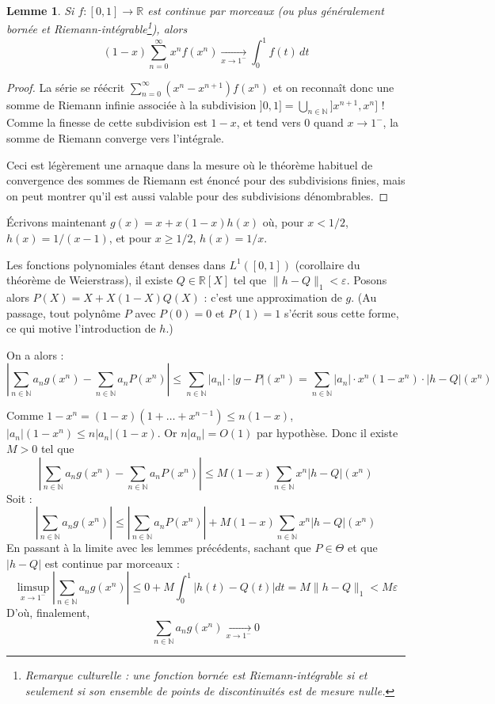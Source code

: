 \documentclass[a4paper, 11pt]{article}
\def\N{\mathbb{N}}
\def\R{\mathbb{R}}
\newtheorem*{lemma}{Lemme}
\begin{document}
\begin{lemma}
  Si $f : [0,1] \to \R$ est continue par morceaux (ou plus généralement bornée
  et Riemann-intégrable\footnote{Remarque culturelle : une fonction bornée est
    Riemann-intégrable si et seulement si son ensemble de points de
    discontinuités est de mesure nulle.}), alors
  \[ (1-x) \sum_{n=0}^\infty x^nf(x^n) \xrightarrow[x \to 1^{-}]{} \int_0^1
    f(t)\,dt\]
\end{lemma}
\begin{proof}
  La série se réécrit $\sum_{n=0}^\infty (x^n - x^{n+1})f(x^n)$ et on reconnaît
  donc une somme de Riemann infinie associée à la subdivision $]0,1] =
  \bigcup_{n \in \N} ]x^{n+1},x^n]$ ! Comme la finesse de cette subdivision est
  $1-x$, et tend vers $0$ quand $x \to 1^-$, la somme de Riemann converge vers
  l'intégrale.
  
  Ceci est légèrement une arnaque dans la mesure où le théorème habituel de
  convergence des sommes de Riemann est énoncé pour des subdivisions finies,
  mais on peut montrer qu'il est aussi valable pour des subdivisions
  dénombrables.
\end{proof}

Écrivons maintenant $g(x) = x + x(1-x)h(x)$ où, pour $x < 1/2$, $h(x) =
1/(x-1)$, et pour $x \geq 1/2$, $h(x) = 1/x$. 

Les fonctions polynomiales étant denses dans $L^1([0,1])$ (corollaire du
théorème de Weierstrass), il existe $Q \in \R[X]$ tel que $\|h-Q\|_1 <
\varepsilon$. Posons alors $P(X) = X + X(1-X)Q(X)$ : c'est une approximation de
$g$. (Au passage, tout polynôme $P$ avec $P(0) = 0$ et $P(1) = 1$ s'écrit sous
cette forme, ce qui motive l'introduction de $h$.)

On a alors :
\[ \left| \sum_{n \in \N} a_n g(x^n) - \sum_{n \in \N} a_n P(x^n) \right| \leq
  \sum_{n \in \N} |a_n| \cdot |g - P|(x^n) = \sum_{n \in \N} |a_n| \cdot
  x^n(1-x^n) \cdot |h - Q|(x^n) \]

Comme $1-x^n = (1-x)(1+ \ldots + x^{n-1}) \leq n(1-x)$, $|a_n|(1-x^n) \leq
n|a_n|(1-x)$. Or $n|a_n| = O(1)$ par hypothèse. Donc il existe $M > 0$ tel que
\[ \left| \sum_{n \in \N} a_n g(x^n) - \sum_{n \in \N} a_n P(x^n) \right| \leq
  M (1-x) \sum_{n \in \N} x^n|h - Q|(x^n) \]
Soit :
\[ \left| \sum_{n \in \N} a_n g(x^n) \right| \leq
  \left| \sum_{n \in \N} a_n P(x^n) \right| +
  M (1-x) \sum_{n \in \N} x^n|h - Q|(x^n) \]
En passant à la limite avec les lemmes précédents, sachant que $P \in \Theta$ et
que $|h-Q|$ est continue par morceaux :
\[ \limsup_{x \to 1^-} \left| \sum_{n \in \N} a_n g(x^n) \right| \leq
  0 + M \int_0^1 |h(t) - Q(t)|dt = M \|h-Q\|_1 < M\varepsilon \]
D'où, finalement,
\[ \sum_{n \in \N} a_n g(x^n) \xrightarrow[x \to 1^-]{} 0 \]
\end{document}
